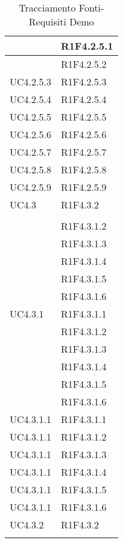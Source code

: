 \begin{longtable}{|>{\centering}m{5cm}|m{5cm}<{\centering}|}
{UC4.2.5.1}&{R1F4.2.5.1}\\ \hline
{UC4.2.5.2}&{R1F4.2.5.2}\\ \hline
{UC4.2.5.3}&{R1F4.2.5.3}\\ \hline
{UC4.2.5.4}&{R1F4.2.5.4}\\ \hline
{UC4.2.5.5}&{R1F4.2.5.5}\\ \hline
{UC4.2.5.6}&{R1F4.2.5.6}\\ \hline
{UC4.2.5.7}&{R1F4.2.5.7}\\ \hline
{UC4.2.5.8}&{R1F4.2.5.8}\\ \hline
{UC4.2.5.9}&{R1F4.2.5.9}\\ \hline

{UC4.3}&{R1F4.3.2}\\
{R1F4.3.1.1}\\
&{R1F4.3.1.2}\\
&{R1F4.3.1.3}\\
&{R1F4.3.1.4}\\
&{R1F4.3.1.5}\\
&{R1F4.3.1.6}\\ \hline
{UC4.3.1}&{R1F4.3.1.1}\\
&{R1F4.3.1.2}\\
&{R1F4.3.1.3}\\
&{R1F4.3.1.4}\\
&{R1F4.3.1.5}\\
&{R1F4.3.1.6}\\ \hline
{UC4.3.1.1}&{R1F4.3.1.1}\\ \hline
{UC4.3.1.1}&{R1F4.3.1.2}\\ \hline
{UC4.3.1.1}&{R1F4.3.1.3}\\ \hline
{UC4.3.1.1}&{R1F4.3.1.4}\\ \hline
{UC4.3.1.1}&{R1F4.3.1.5}\\ \hline
{UC4.3.1.1}&{R1F4.3.1.6}\\ \hline
{UC4.3.2}&{R1F4.3.2}\\ \hline

\caption[Tracciamento Fonti-Requisiti Demo]{Tracciamento Fonti-Requisiti Demo}
\label{tabella: Tracciamento Fonti-Requisiti Demo}
\end{longtable}
\newpage